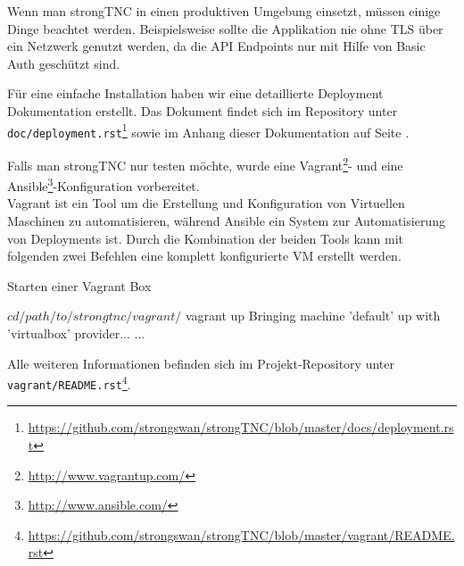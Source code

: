 Wenn man strongTNC in einen produktiven Umgebung einsetzt, müssen einige Dinge
beachtet werden. Beispielsweise sollte die Applikation nie ohne TLS über ein Netzwerk genutzt werden, da die API Endpoints nur mit Hilfe von Basic
Auth geschützt sind.

Für eine einfache Installation haben wir eine detaillierte Deployment Dokumentation erstellt. Das Dokument findet sich im Repository unter
\texttt{doc/deployment.rst}\footnote{\url{https://github.com/strongswan/strongTNC/blob/master/docs/deployment.rst}}
sowie im Anhang dieser Dokumentation auf Seite
\pageref{anhang:deployment-manual}.

Falls man strongTNC nur testen möchte, wurde eine
Vagrant\footnote{\url{http://www.vagrantup.com/}}- und eine
Ansible\footnote{\url{http://www.ansible.com/}}-Konfiguration vorbereitet.\\
Vagrant ist ein Tool um die Erstellung und Konfiguration von Virtuellen
Maschinen zu automatisieren, während Ansible ein System zur Automatisierung von
Deployments ist. Durch die Kombination der beiden Tools kann mit folgenden zwei
Befehlen eine komplett konfigurierte VM erstellt werden.

\begin{listing}
\caption{Starten einer Vagrant Box}
\begin{textcode}
$ cd /path/to/strongtnc/vagrant/
$ vagrant up
Bringing machine 'default' up with 'virtualbox' provider...
...
\end{textcode}
\end{listing}

Alle weiteren Informationen befinden sich im Projekt-Repository unter
\texttt{vagrant/README.rst}\footnote{\url{https://github.com/strongswan/strongTNC/blob/master/vagrant/README.rst}}.

